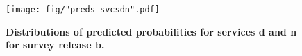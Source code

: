 \documentclass{article}\usepackage[]{graphicx}\usepackage[]{color}
\begin{document}
                                                                                                                                                                                                                                                                                                                                                                                                                                                                                                                                                                                                \begin{figure}[htbp]
                                                                                                                                                                                                                                                                                                                                                                                                                                                                                                                                                                                                \begin{center}
                                                                                                                                                                                                                                                                                                                                                                                                                                                                                                                                                                                                \texttt{[image: fig/"preds-svcsdn".pdf]}
                                                                                                                                                                                                                                                                                                                                                                                                                                                                                                                                                                                                \caption{\textbf{Distributions of predicted probabilities for services d and n for survey release b.}}
                                                                                                                                                                                                                                                                                                                                                                                                                                                                                                                                                                                                \label{fig-svcsdn}

\end{center}
\end{figure}
\end{document}
